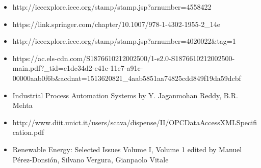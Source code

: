 \documentclass[twosided,a4,10pt]{article}
\begin{document}
\begin{multicols}{2}

 
 
\end{multicols}
\newpage



\begin{itemize}
\item http://ieeexplore.ieee.org/stamp/stamp.jsp?arnumber=4558422 
\item https://link.springer.com/chapter/10.1007/978-1-4302-1955-2\_14e

\item http://ieeexplore.ieee.org/stamp/stamp.jsp?arnumber=4020022\&tag=1 
\item https://ac.els-cdn.com/S1876610212002500/1-s2.0-S1876610212002500-main.pdf?\_tid=c1dc34d2-e41e-11e7-a91c-00000aab0f6b\&acdnat=1513620821\_4aab5851aa74825cdd849f19da59dcbf 

\item Industrial Process Automation Systems by Y. Jaganmohan Reddy, B.R. Mehta

\item http://www.diit.unict.it/users/scava/dispense/II/OPCDataAccessXMLSpecification.pdf

\item Renewable Energy: Selected Issues Volume I, Volume 1
edited by Manuel Pérez-Donsión, Silvano Vergura, Gianpaolo Vitale

\end{itemize}
\end{document}
